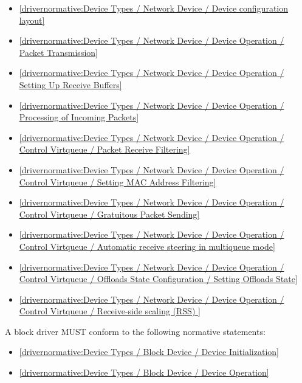 \begin{itemize}
\item \ref{drivernormative:Device Types / Network Device / Device configuration layout}
\item \ref{drivernormative:Device Types / Network Device / Device Operation / Packet Transmission}
\item \ref{drivernormative:Device Types / Network Device / Device Operation / Setting Up Receive Buffers}
\item \ref{drivernormative:Device Types / Network Device / Device Operation / Processing of Incoming Packets}
\item \ref{drivernormative:Device Types / Network Device / Device Operation / Control Virtqueue / Packet Receive Filtering}
\item \ref{drivernormative:Device Types / Network Device / Device Operation / Control Virtqueue / Setting MAC Address Filtering}
\item \ref{drivernormative:Device Types / Network Device / Device Operation / Control Virtqueue / Gratuitous Packet Sending}
\item \ref{drivernormative:Device Types / Network Device / Device Operation / Control Virtqueue / Automatic receive steering in multiqueue mode}
\item \ref{drivernormative:Device Types / Network Device / Device Operation / Control Virtqueue / Offloads State Configuration / Setting Offloads State}
\item \ref{drivernormative:Device Types / Network Device / Device Operation / Control Virtqueue / Receive-side scaling (RSS) }
\end{itemize}

\label{sec:Conformance / Driver Conformance / Block Driver Conformance}

A block driver MUST conform to the following normative statements:

\begin{itemize}
\item \ref{drivernormative:Device Types / Block Device / Device Initialization}
\item \ref{drivernormative:Device Types / Block Device / Device Operation}
\end{itemize}

\label{sec:Conformance / Driver Conformance / Console Driver Conformance}

